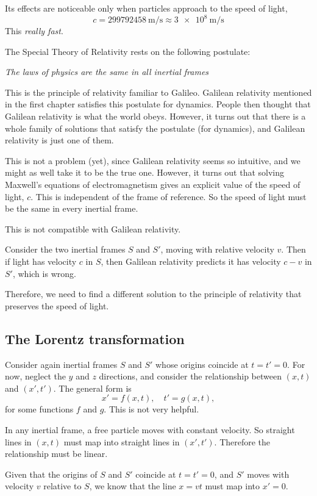 \documentclass[a4paper]{article}
\begin{document}
Its effects are noticeable only when particles approach to the speed of light,
\[
  c = \SI{299792458}{\meter\per\second} \approx \SI{3e8}{\meter\per\second}
\]
This \emph{really fast}.

The Special Theory of Relativity rests on the following postulate:
\begin{center}
  \emph{The laws of physics are the same in all inertial frames}
\end{center}
This is the principle of relativity familiar to Galileo. Galilean relativity mentioned in the first chapter satisfies this postulate for dynamics. People then thought that Galilean relativity is what the world obeys. However, it turns out that there is a whole family of solutions that satisfy the postulate (for dynamics), and Galilean relativity is just one of them.

This is not a problem (yet), since Galilean relativity seems so intuitive, and we might as well take it to be the true one. However, it turns out that solving Maxwell's equations of electromagnetism gives an explicit value of the speed of light, $c$. This is independent of the frame of reference. So the speed of light must be the same in every inertial frame.

This is not compatible with Galilean relativity.

Consider the two inertial frames $S$ and $S'$, moving with relative velocity $v$. Then if light has velocity $c$ in $S$, then Galilean relativity predicts it has velocity $c - v$ in $S'$, which is wrong.

Therefore, we need to find a different solution to the principle of relativity that preserves the speed of light.

\subsection{The Lorentz transformation}
Consider again inertial frames $S$ and $S'$ whose origins coincide at $t = t' = 0$. For now, neglect the $y$ and $z$ directions, and consider the relationship between $(x, t)$ and $(x', t')$. The general form is
\[
  x' = f(x, t),\quad t' = g(x, t),
\]
for some functions $f$ and $g$. This is not very helpful.

In any inertial frame, a free particle moves with constant velocity. So straight lines in $(x, t)$ must map into straight lines in $(x', t')$. Therefore the relationship must be linear.

Given that the origins of $S$ and $S'$ coincide at $t = t' = 0$, and $S'$ moves with velocity $v$ relative to $S$, we know that the line $x = vt$ must map into $x'= 0$.
\end{document}
